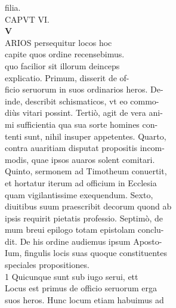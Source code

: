 \documentclass{article}
\begin{document}
\begin{pages}
                filia. \\
                CAPVT VI. \\
                \textbf{V \\
                }ARIOS persequitur locos hoc \\
                capite quos ordine recensebimus. \\
                quo facilior sit illorum deinceps \\
                explicatio. Primum, disserit de of- \\
                ficio seruorum in suos ordinarios heros. De- \\
                inde, describit schismaticos, vt eo commo- \\
                diùs vitari possint. Tertiò, agit de vera ani- \\
                mi sufficientia qua sua sorte homines con- \\
                tenti sunt, nihil insuper appetentes. Quarto, \\
                contra auaritiam disputat propositis incom- \\
                modis, quae ipsos auaros solent comitari. \\
                Quinto, sermonem ad Timotheum conuertit, \\
                et hortatur iterum ad officium in Ecclesia \\
                quam vigilantissime exequendum. Sexto, \\
                diuitibus suum praescribit decorum quond ab \\
                ipsis requirit pietatis professio. Septimò, de \\
                mum breui epilogo totam epistolam conclu- \\
                dit. De his ordine audiemus ipsum Aposto- \\
                Ium, fingulis locis suas quoque constituentes \\
                speciales propositiones. \\
                1 Quicunque sunt sub iugo serui, ett \\
                Locus est primus de officio seruorum erga \\
                suos heros. Hunc locum etiam habuimus ad \\

\end{pages}
\end{document}
